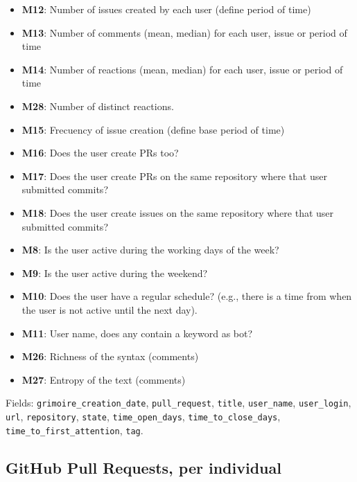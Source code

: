 \documentclass[a4paper, 12pt]{book}
\begin{document}
\begin{itemize}
    \item \textbf{M12}: Number of issues created by each user (define period of time)
    \item \textbf{M13}: Number of comments (mean, median) for each user, issue or period of time
    \item \textbf{M14}: Number of reactions (mean, median) for each user, issue or period of time
    \item \textbf{M28}: Number of distinct reactions.
    \item \textbf{M15}: Frecuency of issue creation (define base period of time)
    \item \textbf{M16}: Does the user create PRs too?
    \item \textbf{M17}: Does the user create PRs on the same repository where that user submitted commits?
    \item \textbf{M18}: Does the user create issues on the same repository where that user submitted commits?
    \item \textbf{M8}: Is the user active during the working days of the week? 
    \item \textbf{M9}: Is the user active during the weekend?
    \item \textbf{M10}: Does the user have a regular schedule? (e.g., there is a time from when the user is not active until the next day).
    \item \textbf{M11}: User name, does any contain a keyword as bot? 
    \item \textbf{M26}: Richness of the syntax (comments)
    \item \textbf{M27}: Entropy of the text (comments)
\end{itemize}

Fields: \texttt{grimoire\_creation\_date}, \texttt{pull\_request}, \texttt{title}, \texttt{user\_name}, \texttt{user\_login}, \texttt{url}, \texttt{repository}, \texttt{state}, \texttt{time\_open\_days}, \texttt{time\_to\_close\_days}, \texttt{time\_to\_first\_attention}, \texttt{tag}.

\subsection{GitHub Pull Requests, per individual}
\end{document}
